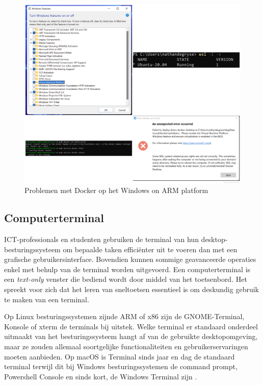 \begin{figure}[!h]
	\centering
	\includegraphics[width=\linewidth]{img/docker_issues_winARM.png}
	\caption{Problemen met Docker op het Windows on ARM platform}
\end{figure}

\pagebreak
\subsection{Computerterminal}
ICT-professionals en studenten gebruiken de terminal van hun desktop-besturingssysteem om bepaalde taken efficiënter uit te voeren dan met een grafische gebruikersinterface. Bovendien kunnen sommige geavanceerde operaties enkel met behulp van de terminal worden uitgevoerd. Een computerterminal is een \textit{text-only} venster die bediend wordt door middel van het toetsenbord. Het spreekt voor zich dat het leren van sneltoetsen essentieel is om deskundig gebruik te maken van een terminal. 

Op Linux besturingssystemen zijnde ARM of x86 zijn de GNOME-Terminal, Konsole of xterm de terminals bij uitstek. Welke terminal er standaard onderdeel uitmaakt van het besturingssysteem hangt af van de gebruikte desktopomgeving, maar ze zouden allemaal soortgelijke functionaliteiten en gebruikerservaringen moeten aanbieden. Op macOS is Terminal sinds jaar en dag de standaard terminal terwijl dit bij Windows besturingssystemen de command prompt, Powershell Console en sinds kort, de Windows Terminal zijn \autocite{Woodfine2020}. 

